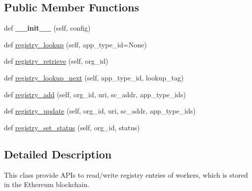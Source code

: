 \subsection*{Public Member Functions}
\begin{DoxyCompactItemize}
\item 
\mbox{\label{classavalon__sdk_1_1connector_1_1blockchains_1_1ethereum_1_1ethereum__worker__registry__list_1_1EthereumWorkerRegistryListImpl_ab19e8372ee46f018de0018fe5bef1106}} 
def {\bfseries \+\_\+\+\_\+init\+\_\+\+\_\+} (self, config)
\item 
def \hyperlink{classavalon__sdk_1_1connector_1_1blockchains_1_1ethereum_1_1ethereum__worker__registry__list_1_1EthereumWorkerRegistryListImpl_a181025d95e2300a662b5d6e822142713}{registry\+\_\+lookup} (self, app\+\_\+type\+\_\+id=None)
\item 
def \hyperlink{classavalon__sdk_1_1connector_1_1blockchains_1_1ethereum_1_1ethereum__worker__registry__list_1_1EthereumWorkerRegistryListImpl_a9d885ff695a2d6125222eb3e8529c81b}{registry\+\_\+retrieve} (self, org\+\_\+id)
\item 
def \hyperlink{classavalon__sdk_1_1connector_1_1blockchains_1_1ethereum_1_1ethereum__worker__registry__list_1_1EthereumWorkerRegistryListImpl_a1219341d2a9161ada781cde3d8b20a7c}{registry\+\_\+lookup\+\_\+next} (self, app\+\_\+type\+\_\+id, lookup\+\_\+tag)
\item 
def \hyperlink{classavalon__sdk_1_1connector_1_1blockchains_1_1ethereum_1_1ethereum__worker__registry__list_1_1EthereumWorkerRegistryListImpl_adb190236464b290ceb425dba95f47fe9}{registry\+\_\+add} (self, org\+\_\+id, uri, sc\+\_\+addr, app\+\_\+type\+\_\+ids)
\item 
def \hyperlink{classavalon__sdk_1_1connector_1_1blockchains_1_1ethereum_1_1ethereum__worker__registry__list_1_1EthereumWorkerRegistryListImpl_a4ddeac672c8a2ecd38ec7b1a38edc74b}{registry\+\_\+update} (self, org\+\_\+id, uri, sc\+\_\+addr, app\+\_\+type\+\_\+ids)
\item 
def \hyperlink{classavalon__sdk_1_1connector_1_1blockchains_1_1ethereum_1_1ethereum__worker__registry__list_1_1EthereumWorkerRegistryListImpl_ada2447abc644cc0eb8e774ddeb12fcec}{registry\+\_\+set\+\_\+status} (self, org\+\_\+id, status)
\end{DoxyCompactItemize}


\subsection{Detailed Description}
\begin{DoxyVerb}This class provide APIs to read/write registry entries of workers,
which is stored in the Ethereum blockchain.
\end{DoxyVerb}
 

